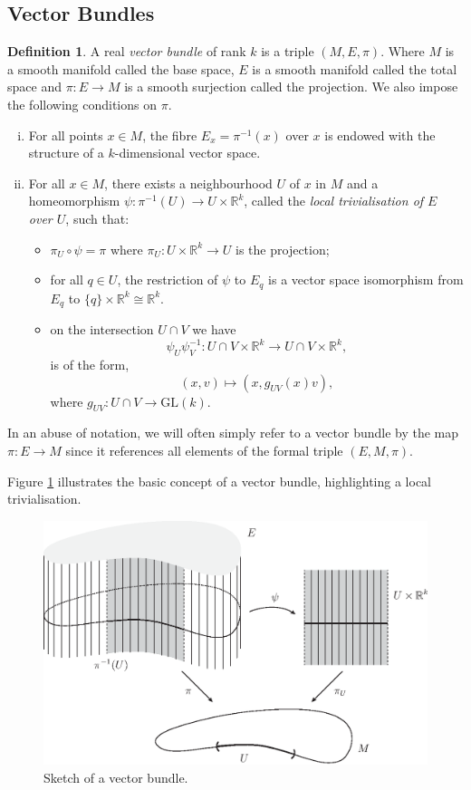 \documentclass[12pt,a4paper]{article}
\numberwithin{equation}{section}
\theoremstyle{definition}
\newtheorem{definition}{Definition}[section]
\theoremstyle{remark}
\begin{document}
\subsection{Vector Bundles}
\begin{definition}
A real \textit{vector bundle} of rank $k$ is a triple $(M,E,\pi)$. Where $M$ is a smooth manifold called the base space, $E$ is a smooth manifold called the total space and $\pi:E\to M$ is a smooth surjection called the projection. We also impose the following conditions on $\pi$.
\begin{enumerate}[(i)]
\item For all points $x\in M$, the fibre $E_x=\pi^{-1}(x)$ over $x$ is endowed with the structure of a $k$-dimensional vector space.
\item For all $x\in M$, there exists a neighbourhood $U$ of $x$ in $M$ and a homeomorphism $\psi:\pi^{-1}(U)\to U\times\mathbb{R}^k$, called the \textit{local trivialisation of $E$ over $U$}, such that:
\begin{itemize}
\item $\pi_U\circ\psi=\pi$ where $\pi_U:U\times\mathbb{R}^k\to U$ is the projection;
\item for all $q\in U$, the restriction of $\psi$ to $E_q$ is a vector space isomorphism from $E_q$ to $\{q\}\times\mathbb{R}^k\cong\mathbb{R}^k$.
\item on the intersection $U\cap V$ we have
\[
\psi_U\psi^{-1}_V:U\cap V\times\mathbb{R}^k\to U\cap V\times\mathbb{R}^k,
\]
is of the form,
\[
(x,v)\mapsto\left(x,g_{UV}(x)v\right),
\]
where $g_{UV}:U\cap V\to\mathrm{GL}(k)$.
\end{itemize}
\end{enumerate}
In an abuse of notation, we will often simply refer to a vector bundle by the map $\pi:E\to M$ since it references all elements of the formal triple $(E,M,\pi)$. 
\end{definition}

Figure \ref{fig:bundle-1} illustrates the basic concept of a vector bundle, highlighting a local trivialisation.

\begin{figure}[h!]
\centering
\includegraphics[scale=0.75]{fig/bundle-2b}
\caption{Sketch of a vector bundle.}
\label{fig:bundle-1}
\end{figure}
\end{document}
